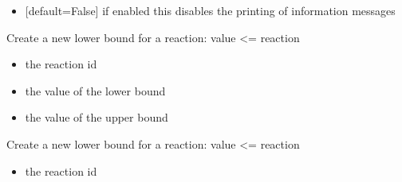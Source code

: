 \documentclass[letterpaper,10pt,english]{sphinxmanual}
\begin{document}
\begin{fulllineitems}
\begin{fulllineitems}
\begin{itemize}
\item {} 
\sphinxAtStartPar
{} {[}default=False{]} if enabled this disables the printing of information messages

\end{itemize}

\end{fulllineitems}


\begin{fulllineitems}
\label{\detokenize{modules_doc:cbmpy.CBModel.Model.createReactionBounds}}
\pysigstartsignatures
{}
\pysigstopsignatures
\sphinxAtStartPar
Create a new lower bound for a reaction: value \textless{}= reaction
\begin{itemize}
\item {} 
\sphinxAtStartPar
{} the reaction id

\item {} 
\sphinxAtStartPar
{} the value of the lower bound

\item {} 
\sphinxAtStartPar
{} the value of the upper bound

\end{itemize}

\end{fulllineitems}


\begin{fulllineitems}
\label{\detokenize{modules_doc:cbmpy.CBModel.Model.createReactionLowerBound}}
\pysigstartsignatures
{}
\pysigstopsignatures
\sphinxAtStartPar
Create a new lower bound for a reaction: value \textless{}= reaction
\begin{itemize}
\item {} 
\sphinxAtStartPar
{} the reaction id


\end{itemize}
\end{fulllineitems}
\end{fulllineitems}
\end{document}
